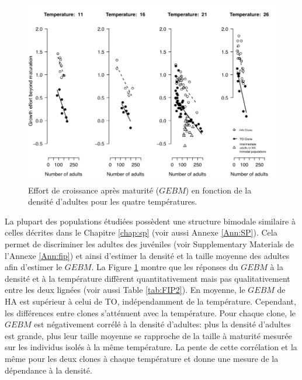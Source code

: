 \begin{figure}[!ht]
\begin{center}
\includegraphics[width=\textwidth]{1_CorpsDeThese/Resumes/Fig/FIP05}
\caption[GEBM]{Effort de croissance
après maturité ($GEBM$) en fonction de la densité d'adultes pour les quatre
températures. }
\label{fig:FIP5}
\end{center}
\end{figure}

La plupart des populations étudiées possèdent une structure bimodale similaire à
celles décrites dans le Chapitre \ref{chap:sp} (voir aussi Annexe \ref{Ann:SP}).
Cela permet de discriminer les adultes des juvéniles (voir Supplementary Materials de l'Annexe \ref{Ann:fip})
et ainsi d'estimer la densité et la taille moyenne des adultes afin d'estimer le
$GEBM$. La Figure \ref{fig:FIP5} montre que les réponses du $GEBM$ à la
densité et à la température diffèrent quantitativement mais pas qualitativement
entre les deux lignées (voir aussi Table \ref{tab:FIP2}). En moyenne, le $GEBM$
de HA est supérieur à celui de TO, indépendamment de la température. Cependant,
les différences entre clones s'atténuent avec la température. Pour chaque clone,
le $GEBM$ est négativement corrélé à la densité d'adultes: plus la densité
d'adultes est grande, plus leur taille moyenne se rapproche de la taille à
maturité mesurée sur les individus isolés à la même température. La pente de
cette corrélation et la même pour les deux clones à chaque température et donne
une mesure de la dépendance à la densité. 

